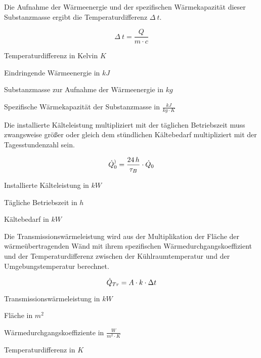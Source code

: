 Die Aufnahme der Wärmeenergie und der spezifischen Wärmekapazität dieser
Substanzmasse ergibt die Temperaturdifferenz $\Delta\:t$.

\begin{equation}
	\Delta\:t = \frac{Q}{m\cdot c}
\label{tdif}
\end{equation}

\begin{description}[\dth]

	\item[$\Delta\:t$] Temperaturdifferenz in Kelvin $K$
	\item[$Q$] Eindringende Wärmeenergie in $kJ$
	\item[$m$] Substanzmasse zur Aufnahme der Wärmeenergie in $kg$
	\item[$c$] Spezifische Wärmekapazität der Substanzmasse in $\frac{kJ}{kg
		\cdot K}$

\end{description}
\vspace{0.5cm}

Die installierte Kälteleistung multipliziert mit der täglichen Betriebszeit muss
zwangsweise größer oder gleich dem stündlichen Kältebedarf multipliziert mit der
Tagesstundenzahl sein.

\begin{equation}
	\pinstall = \frac{24\,h}{ \tau_{B} }  \cdot \pkalt \label{pinstall}
\end{equation}

\begin{description}[\dth]

	\item[$\pinstall$] Installierte Kälteleistung in $kW$
	\item[$\tau_{B}$] Tägliche Betriebszeit in $h$
	\item[$\pkalt$] Kältebedarf in $kW$

\end{description}
\vspace{0.5cm}

Die Transmissionswärmeleistung wird aus der Multiplikation der Fläche
der wärmeübertragenden Wänd mit ihrem spezifischen Wärmedurchgangskoeffizient
und der Temperaturdifferenz zwischen der Kühlraumtemperatur und der
Umgebungstemperatur berechnet.

\begin{equation}
	\ptrans = A \cdot k \cdot \Delta t
	\label{ptrans}
\end{equation}

\begin{description}[\dth]

	\item[$\ptrans$] Transmissionswärmeleistung in $kW$
	\item[$A$] Fläche in $m^2$
	\item[$k$] Wärmedurchgangskoeffiziente in $\frac{W}{m^2 \cdot K}$
	\item[$\Delta\: t$] Temperaturdifferenz in $K$

\end{description}
\vspace{0.5cm}

